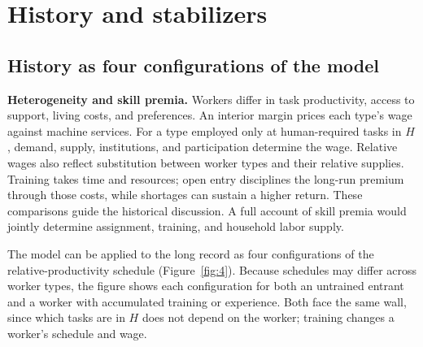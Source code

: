 \documentclass[12pt]{article}
\theoremstyle{plain}
\theoremstyle{definition}
\theoremstyle{remark}
\begin{document}
\section{History and stabilizers}\label{sec:history}

\subsection{History as four configurations of the model}\label{sec:configurations}

\textbf{Heterogeneity and skill premia.} Workers differ in task productivity, access to support, living costs, and preferences. An interior margin prices each type's wage against machine services. For a type employed only at human-required tasks in $H$, demand, supply, institutions, and participation determine the wage. Relative wages also reflect substitution between worker types and their relative supplies. Training takes time and resources; open entry disciplines the long-run premium through those costs, while shortages can sustain a higher return. These comparisons guide the historical discussion. A full account of skill premia would jointly determine assignment, training, and household labor supply.

The model can be applied to the long record as four configurations of the relative-productivity schedule (Figure~\ref{fig:4}). Because schedules may differ across worker types, the figure shows each configuration for both an untrained entrant and a worker with accumulated training or experience. Both face the same wall, since which tasks are in $H$ does not depend on the worker; training changes a worker's schedule and wage.
\end{document}
